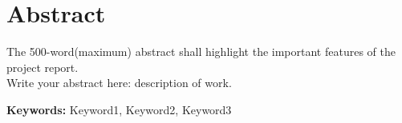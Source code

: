 \chapter*{Abstract}
The 500-word(maximum) abstract shall highlight the important features of the project report. \\
Write your abstract here: description of work.

\textbf{Keywords:} Keyword1, Keyword2, Keyword3